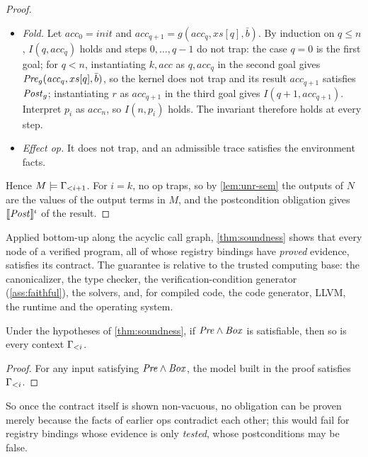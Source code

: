 \begin{proof}
\begin{itemize}
  satisfies $\Post_g$; interpret $p_i$ as the computed collection. Every finite set of
  instances of the universal fact then holds (\cref{lem:weak}).
\item \emph{Fold.} Let $\mathit{acc}_0=\mathit{init}$ and
  $\mathit{acc}_{q+1}=g(\mathit{acc}_q,xs[q],\bar b)$. By induction on $q\le n$, $I(q,
  \mathit{acc}_q)$ holds and steps $0,\dots,q-1$ do not trap: the case $q=0$ is the first goal;
  for $q<n$, instantiating $k,\mathit{acc}$ as $q,\mathit{acc}_q$ in the second goal gives
  $\mathit{Pre}_g(\mathit{acc}_q,xs[q],\bar b)$, so the kernel does not trap and its result
  $\mathit{acc}_{q+1}$ satisfies $\Post_g$; instantiating $r$ as $\mathit{acc}_{q+1}$ in the
  third goal gives $I(q+1,\mathit{acc}_{q+1})$. Interpret $p_i$ as $\mathit{acc}_n$, so
  $I(n,p_i)$ holds. The invariant therefore holds at every step.
\item \emph{Effect op.} It does not trap, and an admissible trace satisfies the environment
  facts.
\end{itemize}
Hence $M\models\Gamma_{<i+1}$. For $i=k$, no op traps, so by \cref{lem:unr-sem} the outputs of $N$
are the values of the output terms in $M$, and the postcondition obligation gives
$\llbracket \mathit{Post} \rrbracket^\iota$ of the result.
\end{proof}

Applied bottom-up along the acyclic call graph, \cref{thm:soundness} shows that every node of a
verified program, all of whose registry bindings have \emph{proved} evidence, satisfies its
contract. The guarantee is relative to the trusted computing base: the canonicalizer, the type
checker, the verification-condition generator (\cref{ass:faithful}), the solvers, and, for
compiled code, the code generator, LLVM, the runtime and the operating system.

\begin{corollary}\label{cor:local-vacuity}
Under the hypotheses of \cref{thm:soundness}, if $\mathit{Pre}\wedge\mathit{Box}$ is satisfiable, then
so is every context $\Gamma_{<i}$.
\end{corollary}
\begin{proof}
For any input satisfying $\mathit{Pre}\wedge\mathit{Box}$, the model built in the proof satisfies
$\Gamma_{<i}$.
\end{proof}

So once the contract itself is shown non-vacuous, no obligation can be proven merely because
the facts of earlier ops contradict each other; this would fail for registry bindings whose
evidence is only \emph{tested}, whose postconditions may be false.

